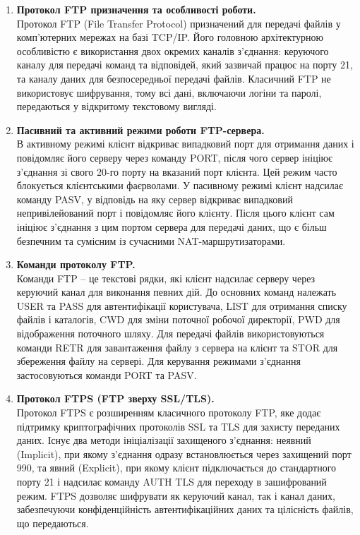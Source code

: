 \documentclass[14pt, a4paper]{extreport}
\begin{document}
	\begin{enumerate}
		\item \textbf{Протокол FTP призначення та особливості роботи.} \\ Протокол FTP (File Transfer Protocol) призначений для передачі файлів у комп'ютерних мережах на базі TCP/IP. Його головною архітектурною особливістю є використання двох окремих каналів з'єднання: керуючого каналу для передачі команд та відповідей, який зазвичай працює на порту 21, та каналу даних для безпосередньої передачі файлів. Класичний FTP не використовує шифрування, тому всі дані, включаючи логіни та паролі, передаються у відкритому текстовому вигляді.
		
		\item \textbf{Пасивний та активний режими роботи FTP-сервера.} \\ В активному режимі клієнт відкриває випадковий порт для отримання даних і повідомляє його серверу через команду PORT, після чого сервер ініціює з'єднання зі свого 20-го порту на вказаний порт клієнта. Цей режим часто блокується клієнтськими фаєрволами. У пасивному режимі клієнт надсилає команду PASV, у відповідь на яку сервер відкриває випадковий непривілейований порт і повідомляє його клієнту. Після цього клієнт сам ініціює з'єднання з цим портом сервера для передачі даних, що є більш безпечним та сумісним із сучасними NAT-маршрутизаторами.
		
		\item \textbf{Команди протоколу FTP.} \\ Команди FTP -- це текстові рядки, які клієнт надсилає серверу через керуючий канал для виконання певних дій. До основних команд належать USER та PASS для автентифікації користувача, LIST для отримання списку файлів і каталогів, CWD для зміни поточної робочої директорії, PWD для відображення поточного шляху. Для передачі файлів використовуються команди RETR для завантаження файлу з сервера на клієнт та STOR для збереження файлу на сервері. Для керування режимами з'єднання застосовуються команди PORT та PASV.
		
		\item \textbf{Протокол FTPS (FTP зверху SSL/TLS).} \\ Протокол FTPS є розширенням класичного протоколу FTP, яке додає підтримку криптографічних протоколів SSL та TLS для захисту переданих даних. Існує два методи ініціалізації захищеного з'єднання: неявний (Implicit), при якому з'єднання одразу встановлюється через захищений порт 990, та явний (Explicit), при якому клієнт підключається до стандартного порту 21 і надсилає команду AUTH TLS для переходу в зашифрований режим. FTPS дозволяє шифрувати як керуючий канал, так і канал даних, забезпечуючи конфіденційність автентифікаційних даних та цілісність файлів, що передаються.
		

\end{enumerate}
\end{document}

